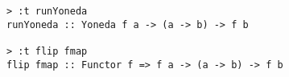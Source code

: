 \begin{repl}\begin{lstlisting}
> :t runYoneda
runYoneda :: Yoneda f a -> (a -> b) -> f b

> :t flip fmap
flip fmap :: Functor f => f a -> (a -> b) -> f b\end{lstlisting}\end{repl}
